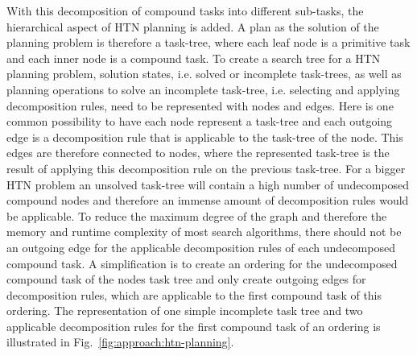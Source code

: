 With this decomposition of compound tasks into different sub-tasks, the hierarchical aspect of HTN planning is added.
A plan as the solution of the planning problem is therefore a task-tree, where each leaf node is a primitive task and each inner node is a compound task.
To create a search tree for a HTN planning problem, solution states, i.e. solved or incomplete task-trees, as well as planning operations to solve an incomplete task-tree, i.e. selecting and applying decomposition rules, need to be represented with nodes and edges.\newline
Here is one common possibility to have each node represent a task-tree and each outgoing edge is a decomposition rule that is applicable to the task-tree of the node.
This edges are therefore connected to nodes, where the represented task-tree is the result of applying this decomposition rule on the previous task-tree.
For a bigger HTN problem an unsolved task-tree will contain a high number of undecomposed compound nodes and therefore an immense amount of decomposition rules would be applicable.
To reduce the maximum degree of the graph and therefore the memory and runtime complexity of most search algorithms, there should not be an outgoing edge for the applicable decomposition rules of each undecomposed compound task.
A simplification is to create an ordering for the undecomposed compound task of the nodes task tree and only create outgoing edges for decomposition rules, which are applicable to the first compound task of this ordering.
The representation of one simple incomplete task tree and two applicable decomposition rules for the first compound task of an ordering is illustrated in Fig.~\ref{fig:approach:htn-planning}.
